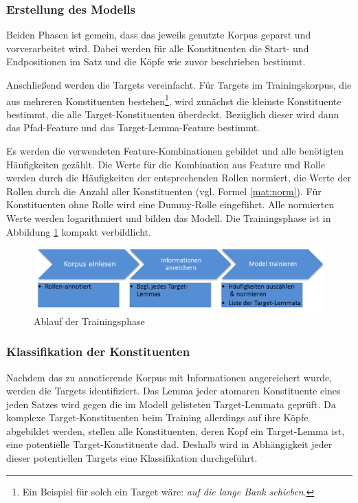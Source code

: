 \documentclass[12pt]{article}
\begin{document}
\subsubsection*{Erstellung des Modells}

Beiden Phasen ist gemein, dass das jeweils genutzte Korpus geparst und vorverarbeitet wird. Dabei werden für alle Konstituenten die Start- und Endpositionen im Satz und die Köpfe wie zuvor beschrieben bestimmt.

Anschließend werden die Targets vereinfacht. Für Targets im Trainingskorpus, die aus mehreren Konstituenten bestehen\footnote{Ein Beispiel für solch ein Target wäre: \textit{auf die lange Bank schieben}.}, wird zunächst die kleinste Konstituente bestimmt, die alle Target-Konstituenten überdeckt. Bezüglich dieser wird dann das Pfad-Feature und das Target-Lemma-Feature bestimmt.

Es werden die verwendeten Feature-Kombinationen gebildet und alle benötigten Häufigkeiten gezählt. Die Werte für die Kombination aus Feature und Rolle werden durch die Häufigkeiten der entsprechenden Rollen normiert, die Werte der Rollen durch die Anzahl aller Konstituenten (vgl. Formel \eqref{mat:norm}). Für Konstituenten ohne Rolle wird eine Dummy-Rolle eingeführt. Alle normierten Werte werden logarithmiert und bilden das Modell. Die Trainingsphase ist in Abbildung \ref{training} kompakt verbildlicht. 

\begin{figure}[tb!]
		\centering
		\includegraphics[scale=0.6]{images/ablaufLernen.png}
		\caption{Ablauf der Trainingsphase}
		\label{training}
	\end{figure}


\subsubsection*{Klassifikation der Konstituenten}\label{subsubsec:classify}

Nachdem das zu annotierende Korpus mit Informationen angereichert wurde, werden die Targets identifiziert. Das Lemma jeder atomaren Konstituente eines jeden Satzes wird gegen die im Modell gelisteten Target-Lemmata geprüft. Da komplexe Target-Konstituenten beim Training allerdings auf ihre Köpfe abgebildet werden, stellen alle Konstituenten, deren Kopf ein Target-Lemma ist, eine potentielle Target-Konstituente dad. Deshalb wird in Abhängigkeit jeder dieser potentiellen Targets eine Klassifikation durchgeführt.
\end{document}
